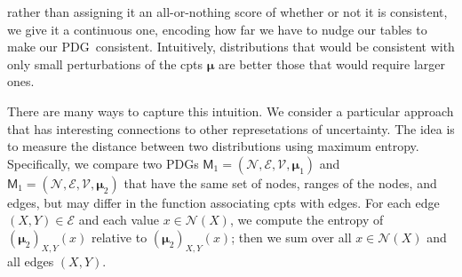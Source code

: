 \documentclass{article}
\newcommand{\bmu}{\boldsymbol{\mu}}
\newcommand{\V}{\mathcal V}
\newcommand{\N}{\mathcal N}
\newcommand{\Ed}{\mathcal E}
\newcommand{\sfM}{\mathsf M}
\newcommand{\MN}{PDG}
\numberwithin{equation}{section}
\begin{document}
\begin{notfocus}
	rather than assigning it an all-or-nothing score of whether or
        not it is consistent, we give it a continuous one, encoding
        how far we have to nudge our tables to make our
        \MN\ consistent. Intuitively, distributions that would be
        consistent with only small perturbations of the cpts $\bmu$
        are better those that would require larger ones.  
        
        There are many ways to capture this intuition.  We consider a
particular approach that has interesting connections to other
represetations  of uncertainty.  The idea is to measure the distance
between two distributions using maximum entropy.  Specifically, we
compare two PDGs $\sfM_1 = (\N, \Ed, \V, \bmu_1)$ and $\sfM_1 = (\N,
\Ed, \V, \bmu_2)$ 
that have the same set of nodes, ranges of the nodes,
and edges, but may differ in the function associating cpts with
edges.  For each edge $(X,Y) \in \Ed$ and each value $x \in \N(X)$, we
compute the entropy of $(\bmu_2)_{X,Y}(x)$ relative to
$(\bmu_2)_{X,Y}(x)$; then we sum over all $x \in \N(X)$ and all edges
$(X,Y)$.  


\end{notfocus}
\end{document}
